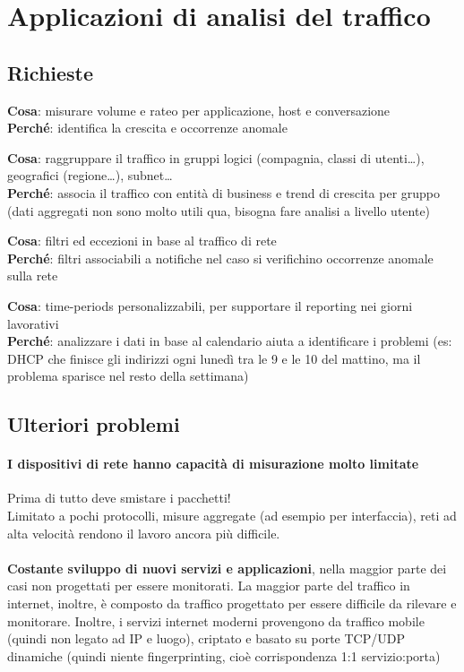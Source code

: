 \documentclass[10pt]{book}
\begin{document}
\section{Applicazioni di analisi del traffico}
\subsection{Richieste}
\begin{list}{}{}
	\item \textbf{Cosa}: misurare volume e rateo per applicazione, host e conversazione\\
	\textbf{Perché}: identifica la crescita e occorrenze anomale
	\item \textbf{Cosa}: raggruppare il traffico in gruppi logici (compagnia, classi di utenti\ldots), geografici (regione\ldots), subnet\ldots\\
	\textbf{Perché}: associa il traffico con entità di business e trend di crescita per gruppo (dati aggregati non sono molto utili qua, bisogna fare analisi a livello utente)
	\item \textbf{Cosa}: filtri ed eccezioni in base al traffico di rete\\
	\textbf{Perché}: filtri associabili a notifiche nel caso si verifichino occorrenze anomale sulla rete
	\item \textbf{Cosa}: time-periods personalizzabili, per supportare il reporting nei giorni lavorativi\\
	\textbf{Perché}: analizzare i dati in base al calendario aiuta a identificare i problemi (es: DHCP che finisce gli indirizzi ogni lunedì tra le 9 e le 10 del mattino, ma il problema sparisce nel resto della settimana)
\end{list}
\subsection{Ulteriori problemi} \paragraph{I dispositivi di rete hanno capacità di misurazione molto limitate} Prima di tutto deve smistare i pacchetti!\\
Limitato a pochi protocolli, misure aggregate (ad esempio per interfaccia), reti ad alta velocità rendono il lavoro ancora più difficile.\\\\
\textbf{Costante sviluppo di nuovi servizi e applicazioni}, nella maggior parte dei casi non progettati per essere monitorati. La maggior parte del traffico in internet, inoltre, è composto da traffico progettato per essere difficile da rilevare e monitorare. Inoltre, i servizi internet moderni provengono da traffico mobile (quindi non legato ad IP e luogo), criptato e basato su porte TCP/UDP dinamiche (quindi niente fingerprinting, cioè corrispondenza 1:1 servizio:porta)
\end{document}
